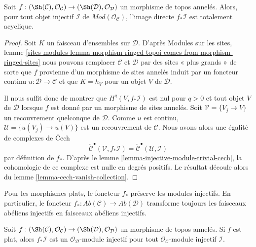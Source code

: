 \begin{lemma}
\label{lemma-direct-image-injective-sheaf}
Soit $f : (\Sh(\mathcal{C}), \mathcal{O}_\mathcal{C}) \to
(\Sh(\mathcal{D}), \mathcal{O}_\mathcal{D})$ un morphisme de topos annelés.
Alors, pour tout objet injectif $\mathcal{I}$ de
$\textit{Mod}(\mathcal{O}_\mathcal{C})$, l'image directe
$f_*\mathcal{I}$ est totalement acyclique.
\end{lemma}

\begin{proof}
Soit $K$ un faisceau d'ensembles sur $\mathcal{D}$.
D'après Modules sur les sites, lemme
\ref{sites-modules-lemma-morphism-ringed-topoi-comes-from-morphism-ringed-sites}
nous pouvons remplacer $\mathcal{C}$ et $\mathcal{D}$ par des sites « plus
grands » de sorte que $f$ provienne d'un morphisme de sites annelés induit par
un foncteur continu $u : \mathcal{D} \to \mathcal{C}$ et que $K = h_V$ pour
un objet $V$ de $\mathcal{D}$.

\medskip\noindent
Il nous suffit donc de montrer que $H^q(V, f_*\mathcal{I})$ est nul pour
$q > 0$ et tout objet $V$ de $\mathcal{D}$ lorsque $f$ est donné par un
morphisme de sites annelés. Soit $\mathcal{V} = \{V_j \to V\}$ un
recouvrement quelconque de $\mathcal{D}$. Comme $u$ est continu,
$\mathcal{U} = \{u(V_j) \to u(V)\}$ est un recouvrement de $\mathcal{C}$.
Nous avons alors une égalité de complexes de {\v C}ech
$$
\check{\mathcal{C}}^\bullet(\mathcal{V}, f_*\mathcal{I})
=
\check{\mathcal{C}}^\bullet(\mathcal{U}, \mathcal{I})
$$
par définition de $f_*$. D'après le
lemme \ref{lemma-injective-module-trivial-cech}, la cohomologie de ce complexe
est nulle en degrés positifs. Le résultat découle alors du
lemme \ref{lemma-cech-vanish-collection}.
\end{proof}

\noindent
Pour les morphismes plats, le foncteur $f_*$ préserve les modules injectifs.
En particulier, le foncteur
$f_* : \textit{Ab}(\mathcal{C}) \to \textit{Ab}(\mathcal{D})$ transforme
toujours les faisceaux abéliens injectifs en faisceaux abéliens injectifs.

\begin{lemma}
\label{lemma-pushforward-injective-flat}
Soit $f : (\Sh(\mathcal{C}), \mathcal{O}_\mathcal{C}) \to
(\Sh(\mathcal{D}), \mathcal{O}_\mathcal{D})$ un morphisme de topos annelés.
Si $f$ est plat, alors $f_*\mathcal{I}$ est un
$\mathcal{O}_\mathcal{D}$-module injectif pour tout
$\mathcal{O}_\mathcal{C}$-module injectif $\mathcal{I}$.
\end{lemma}

